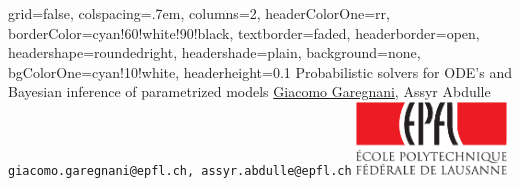 \documentclass[a0paper,fontscale=0.292]{baposter}
\begin{document}
\begin{poster}{
 grid=false,
 colspacing=.7em,
 columns=2,
 headerColorOne=rr,
 borderColor=cyan!60!white!90!black,
 textborder=faded,
 headerborder=open,
 headershape=roundedright,
 headershade=plain,
 background=none,
 bgColorOne=cyan!10!white,
 headerheight=0.1\textheight}
 {
 }
 {\sc\Huge Probabilistic solvers for ODE's and \\ \vspace{0.1in} Bayesian inference of parametrized models}
 {\vspace*{0.2em} \underline{Giacomo Garegnani}, Assyr Abdulle\\[0.5em]
 {\texttt{giacomo.garegnani@epfl.ch, assyr.abdulle@epfl.ch}}}
 {
 \includegraphics[width=4cm]{EPFL_LOG_QUADRI_Red}
 }



\end{poster}
\end{document}
